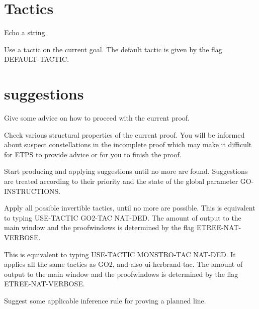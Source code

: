 \section{Tactics}

\begin{description} 
\item[\parbox{\textwidth}{ECHO \textit{echothing}}]  
Echo a string.

\item[\parbox{\textwidth}{USE-TACTIC \textit{tac} \textit{tac-use} \textit{tac-mode}}]  
Use a tactic on the current goal. The default tactic
is given by the flag DEFAULT-TACTIC.
\item
\end{description}

\section{suggestions}

\begin{description} 
\item[\parbox{\textwidth}{ADVICE}]  
Give some advice on how to proceed with the current proof.

\item[\parbox{\textwidth}{CHECK-STRUCTURE}]  
Check various structural properties of the current proof.
You will be informed about suspect constellations in the incomplete proof
which may make it difficult for ETPS to provide advice or for you to
finish the proof.

\item[\parbox{\textwidth}{GO}]  
Start producing and applying suggestions until no more are found.
Suggestions are treated according to their priority and the state of
the global parameter GO-INSTRUCTIONS.

\item[\parbox{\textwidth}{GO2 \textit{tacmode}}]  
Apply all possible invertible tactics, until no more are possible.
This is equivalent to typing USE-TACTIC GO2-TAC NAT-DED.
The amount of output to the main window and the proofwindows is 
determined by the flag ETREE-NAT-VERBOSE.

\item[\parbox{\textwidth}{MONSTRO \textit{tacmode}}]  
This is equivalent to typing USE-TACTIC MONSTRO-TAC NAT-DED.
It applies all the same tactics as GO2, and also ui-herbrand-tac.
The amount of output to the main window and the proofwindows is 
determined by the flag ETREE-NAT-VERBOSE.

\item[\parbox{\textwidth}{SUGGEST \textit{pline}}]  
Suggest some applicable inference rule for proving a planned line.
\item
\end{description}

